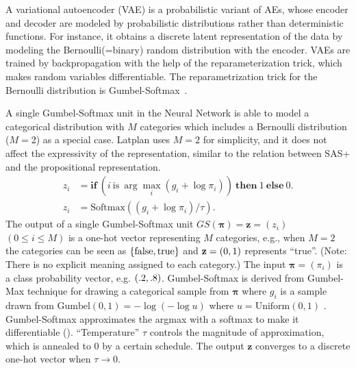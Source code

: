 A variational autoencoder (VAE) \cite{kingma2013auto} is a probabilistic variant of AEs, whose encoder and decoder are modeled by probabilistic distributions rather than deterministic functions.
For instance,
it obtains a discrete latent representation of the data by modeling the Bernoulli(=binary) random distribution with the encoder.
VAEs are trained by backpropagation with the help of the reparameterization trick, which makes random variables differentiable.
The reparametrization trick for the Bernoulli distribution is Gumbel-Softmax~\cite{jang2016categorical}.


A single Gumbel-Softmax unit in the Neural Network is able to model a categorical distribution with $M$ categories
which includes a Bernoulli distribution ($M=2$) as a special case.
Latplan uses $M=2$ for simplicity, and it does not affect the expressivity of the representation,
similar to the relation between SAS+ and the propositional representation.
% 
\begin{align}
z_i &= \textbf{if}\ (i \ \text{is}\ \arg \max_i (g_i+\log \pi_i)) \ \textbf{then}\ 1\ \textbf{else}\ 0. \label{eq:gumbelmax} \\
z_i &= \text{Softmax}((g_i+\log \pi_i)/\tau).                   \label{eq:gumbelsoftmax}
\end{align}
% 
The output of a single Gumbel-Softmax unit $GS(\boldsymbol{\pi}) = \mathbf{z}=(z_i)$ $(0\leq i \le M)$ is a one-hot vector representing $M$ categories, e.g.,
when $M=2$ the categories can be seen as ${\left\{\text{false},\text{true}\right\}}$ and $\mathbf{z}={\left(0,1\right)}$ represents ``true''.
(Note: There is no explicit meaning assigned to each category.)
The input $\boldsymbol{\pi}=(\pi_i)$ is a class probability vector, e.g. ${\left(.2,.8\right)}$.
Gumbel-Softmax is derived from Gumbel-Max technique \cite[]{maddison2014sampling}
for drawing a categorical sample from $\boldsymbol{\pi}$
where $g_i$ is a sample drawn from
 $\text{Gumbel}(0,1) =-\log (-\log u)$ where $u=\text{Uniform}(0,1)$ \cite{gumbel1954statistical}.
Gumbel-Softmax approximates the argmax with a softmax to make it differentiable ().
``Temperature'' $\tau$ controls the magnitude of approximation, which is annealed to 0 by a certain schedule.
The output $\mathbf{z}$ converges to a discrete one-hot vector when $\tau\rightarrow 0$.

